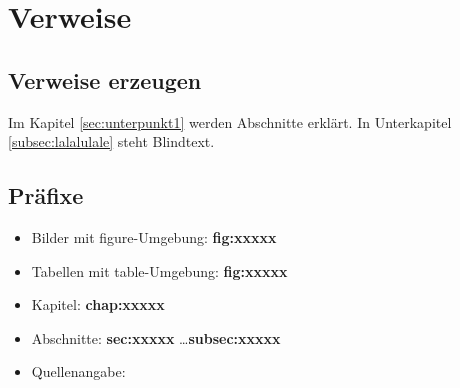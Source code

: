 \chapter{Verweise}

	\section{Verweise erzeugen}
		Im Kapitel \ref{sec:unterpunkt1} werden Abschnitte erklärt. In Unterkapitel \ref{subsec:lalalulale} steht Blindtext.
		
	\section{Präfixe}
		\begin{itemize}
			\item Bilder mit figure-Umgebung: \textbf{fig:xxxxx}
			\item Tabellen mit table-Umgebung: \textbf{fig:xxxxx}
			\item Kapitel: \textbf{chap:xxxxx}
			\item Abschnitte: \textbf{sec:xxxxx} \dots \textbf{subsec:xxxxx}
			\item Quellenangabe: \cite{papula2009}
		\end{itemize}
	